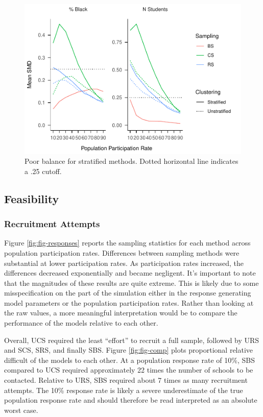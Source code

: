 \documentclass[man,floatsintext]{apa6}
\begin{document}
\begin{figure}
\centering
\includegraphics{GenSamp_Paper_files/figure-latex/fig-SMD-by-Var-bad-1.pdf}
\caption{\label{fig:fig-SMD-by-Var-bad}Poor balance for stratified methods. Dotted horizontal line indicates a .25 cutoff.}
\end{figure}

\hypertarget{feasibility-1}{%
\subsection{Feasibility}\label{feasibility-1}}

\hypertarget{recruitment-attempts}{%
\subsubsection{Recruitment Attempts}\label{recruitment-attempts}}

Figure \ref{fig:fig-responses} reports the sampling statistics for each method across population participation rates. Differences between sampling methods were substantial at lower participation rates. As participation rates increased, the differences decreased exponentially and became negligent. It's important to note that the magnitudes of these results are quite extreme. This is likely due to some misspecification on the part of the simulation either in the response generating model parameters or the population participation rates. Rather than looking at the raw values, a more meaningful interpretation would be to compare the performance of the models relative to each other.

Overall, UCS required the least \enquote{effort} to recruit a full sample, followed by URS and SCS, SRS, and finally SBS. Figure \ref{fig:fig-comp} plots proportional relative difficult of the models to each other. At a population response rate of 10\%, SBS compared to UCS required approximately 22 times the number of schools to be contacted. Relative to URS, SBS required about 7 times as many recruitment attempts. The 10\% response rate is likely a severe underestimate of the true population response rate and should therefore be read interpreted as an absolute worst case.
\end{document}
